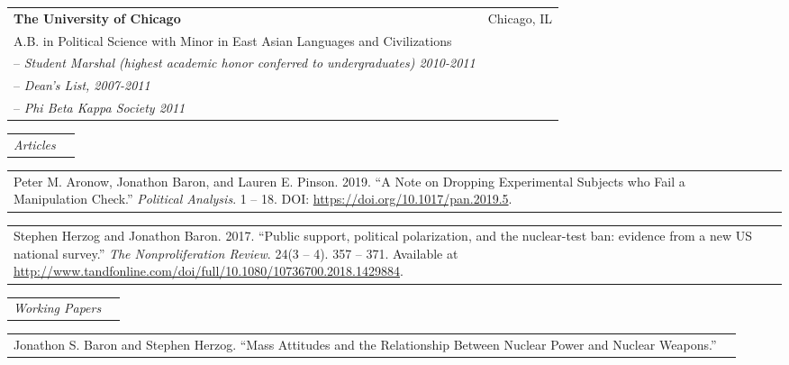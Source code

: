 \documentclass[11pt]{article}
\begin{document}
\vspace{0.13in}

\begin{tabular*}{7.1in}{l@{\extracolsep{\fill}}r}
\textbf{The University of Chicago} & Chicago, IL \\
A.B. in Political Science with Minor in East Asian Languages and Civilizations \\
\quad -- {\it Student Marshal (highest academic honor conferred to undergraduates) 2010-2011} \\
\quad -- {\it Dean's List, 2007-2011} \\
\quad -- {\it Phi Beta Kappa Society 2011} \\
\end{tabular*} 

\vspace{0.13in}

\begin{tabular*}{7.1in}{p{6.925in}p{3cm}}
{\large {\emph{Articles}}}
\end{tabular*} 

\vspace{0.13in}

\begin{tabular*}{7.1in}{p{6.925in}p{3cm}}
Peter M. Aronow, Jonathon Baron, and Lauren E. Pinson. 2019. ``A Note on Dropping Experimental Subjects who Fail a Manipulation Check.'' \textit{Political Analysis}. 1 -- 18. DOI: \url{https://doi.org/10.1017/pan.2019.5}.
\end{tabular*}

\vspace{0.13in}

\begin{tabular*}{7.1in}{p{6.925in}p{3cm}}
Stephen Herzog and Jonathon Baron. 2017. ``Public support, political polarization, and the nuclear-test ban: evidence from a new US national survey.'' {\it The Nonproliferation Review}. 24(3 -- 4). 357 -- 371. Available at \url{http://www.tandfonline.com/doi/full/10.1080/10736700.2018.1429884}.
\end{tabular*}

\vspace{0.13in}
\begin{tabular*}{7.1in}{p{6.925in}p{3cm}}
{\large {\emph{Working Papers}}}
\end{tabular*} 
	
\vspace{0.13in}

\begin{tabular*}{7.1in}{p{6.925in}p{3cm}}
Jonathon S. Baron and Stephen Herzog. ``Mass Attitudes and the Relationship Between Nuclear Power and Nuclear Weapons.''
\end{tabular*}
\end{document}
